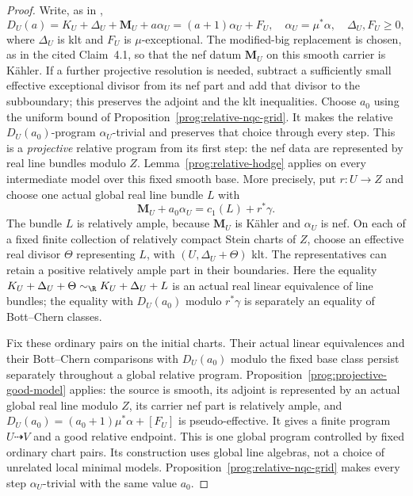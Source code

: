 \begin{proof}
Write, as in \cite[Theorem~4.1, Claim~4.1]{HX},
\[
 D_U(a)=K_U+\Delta_U+\mathbf M_U+a\alpha_U
     =(a+1)\alpha_U+F_U,
 \quad \alpha_U=\mu^*\alpha,\quad
 \Delta_U,F_U\geq0,
\]
where $\Delta_U$ is klt and $F_U$ is $\mu$-exceptional.
The modified-big replacement is chosen, as in the cited Claim~4.1,
so that the nef datum $\mathbf M_U$ on this smooth carrier is
K\"ahler. If a further projective resolution is needed, subtract a
sufficiently small effective exceptional divisor from its nef part
and add that divisor to the subboundary; this preserves the
adjoint and the klt inequalities.
Choose $a_0$ using the uniform bound of
Proposition~\ref{prog:relative-nqc-grid}. It makes the relative
$D_U(a_0)$-program $\alpha_U$-trivial and preserves that choice
through every step. This is a
\emph{projective} relative program from its first step: the nef
data are represented by real line bundles modulo $Z$.
Lemma~\ref{prog:relative-hodge} applies on every
intermediate model over this fixed smooth base.
More precisely, put $r:U\to Z$ and choose one actual global real
line bundle $L$ with
\[
 \mathbf M_U+a_0\alpha_U=c_1(L)+r^*\gamma.
\]
The bundle $L$ is relatively ample, because $\mathbf M_U$ is
K\"ahler and $\alpha_U$ is nef. On each of a fixed finite collection
of relatively compact Stein charts of $Z$, choose an effective
real divisor $\Theta$ representing $L$, with $(U,\Delta_U+\Theta)$
klt. The representatives can retain a positive relatively ample
part in their boundaries. Here the equality
$K_U+\Delta_U+\Theta\sim_{\R}K_U+\Delta_U+L$ is an actual
real linear equivalence of line bundles; the equality with
$D_U(a_0)$ modulo $r^*\gamma$ is separately an equality of
Bott--Chern classes.

Fix these ordinary pairs on the initial charts. Their actual
linear equivalences and their Bott--Chern comparisons with $D_U(a_0)$
modulo the fixed base class persist separately throughout a global
relative program. Proposition~\ref{prog:projective-good-model} applies:
the source is smooth, its adjoint is represented by an actual global
real line modulo $Z$, its carrier nef part is relatively ample, and
$D_U(a_0)=(a_0+1)\mu^*\alpha+[F_U]$ is pseudo-effective.
It gives a finite program $U\dasharrow V$ and a good relative endpoint.
This is one global program controlled by fixed ordinary chart pairs.
Its construction uses global line algebras, not a choice of unrelated
local minimal models. Proposition~\ref{prog:relative-nqc-grid} makes
every step $\alpha_U$-trivial with the same value $a_0$.


\end{proof}

